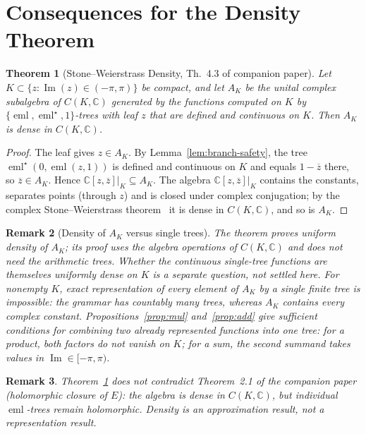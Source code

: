 \documentclass[11pt,a4paper]{article}
\newtheorem{theorem}{Theorem}[section]
\newtheorem{remark}[theorem]{Remark}
\theoremstyle{definition}
\newcommand{\eml}{\operatorname{eml}}
\newcommand{\emlstar}{\operatorname{eml}^\star}
\newcommand{\conj}[1]{\overline{#1}}
\newcommand{\C}{\mathbb{C}}
\newcommand{\im}{\operatorname{Im}}
\begin{document}
\section{Consequences for the Density Theorem}
\label{sec:density}

\begin{theorem}[Stone--Weierstrass Density, Th.~4.3 of companion paper]
\label{thm:density}
Let $K\subset\{z:\im(z)\in(-\pi,\pi)\}$ be compact, and let $A_K$ be the
unital complex subalgebra of $C(K,\C)$ generated by the functions computed
on $K$ by $\{\eml,\emlstar,1\}$-trees with leaf $z$ that are defined and
continuous on $K$.  Then $A_K$ is dense in $C(K,\C)$.
\end{theorem}

\begin{proof}
The leaf gives $z\in A_K$.  By Lemma~\ref{lem:branch-safety}, the tree
$\emlstar(0,\eml(z,1))$ is defined and continuous on $K$ and equals
$1-\conj{z}$ there, so $\conj{z}\in A_K$.  Hence
$\C[z,\conj{z}]\big|_K\subseteq A_K$.  The algebra $\C[z,\conj{z}]\big|_K$
contains the constants, separates points (through $z$) and is closed under
complex conjugation; by the complex Stone--Weierstrass
theorem~\cite{stone1948} it is dense in $C(K,\C)$, and so is $A_K$.
\end{proof}

\begin{remark}[Density of $A_K$ versus single trees]
The theorem proves uniform density of $A_K$; its proof uses the algebra
operations of $C(K,\C)$ and does not need the arithmetic trees.  Whether the
continuous single-tree functions are themselves uniformly dense on $K$ is a
separate question, not settled here.  For nonempty $K$, exact representation
of every element of $A_K$ by a single finite tree is impossible: the grammar
has countably many trees, whereas $A_K$ contains every complex constant.
Propositions~\ref{prop:mul} and~\ref{prop:add} give sufficient conditions for
combining two already represented functions into one tree: for a product,
both factors do not vanish on $K$; for a sum, the second summand takes values
in $\im\in[-\pi,\pi)$.
\end{remark}

\begin{remark}
Theorem~\ref{thm:density} does not contradict Theorem~2.1 of the companion
paper (holomorphic closure of $E$): the algebra is \emph{dense} in $C(K,\C)$,
but individual $\eml$-trees remain holomorphic.  Density is an approximation
result, not a representation result.
\end{remark}
\end{document}
